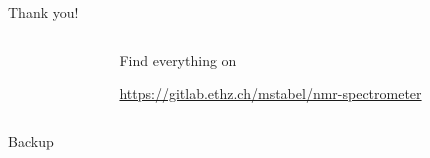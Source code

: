 \documentclass{ethpresentation}
\begin{document}
\begin{frame}{Thank you!}
    \begin{columns}
        \begin{column}{0.5\textwidth}
            \centering
            
        \end{column}
        \begin{column}{0.5\textwidth}
            \centering
            Find everything on \\ \vspace*{\baselineskip}

            

            \url{https://gitlab.ethz.ch/mstabel/nmr-spectrometer}
        \end{column}
    \end{columns}
\end{frame}



\appendix

\begin{frame}[standout]
    Backup
\end{frame}
\end{document}
